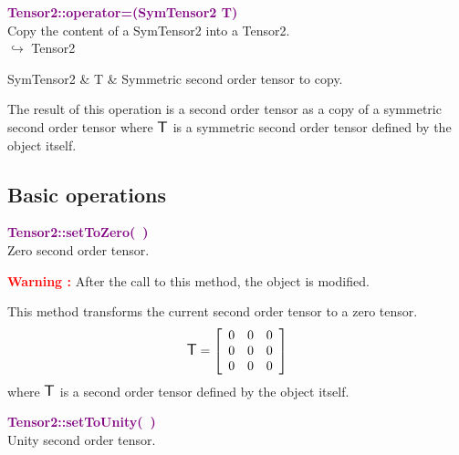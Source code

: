 \textcolor{purple}{\textbf{Tensor2::operator=(SymTensor2 T)}}\label{Tensor2::operator=(SymTensor2 T)}\\
Copy the content of a SymTensor2 into a Tensor2.\\ \hspace*{10mm}$\hookrightarrow$ Tensor2

\begin{tcolorbox}[width=\textwidth,myArgs,tabularx={ll|R}]
SymTensor2 & T & Symmetric second order tensor to copy.
\end{tcolorbox}

The result of this operation is a second order tensor as a copy of a symmetric second order tensor where $\mbox{\large\ensuremath{\mathsf{T}}}$ is a symmetric second order tensor defined by the object itself.

\subsection{Basic operations}

\textcolor{purple}{\textbf{Tensor2::setToZero(~)}}\label{Tensor2::setToZero()}\\
Zero second order tensor.

\hspace*{10mm}\textcolor{red}{\textbf{Warning :}} After the call to this method, the object is modified.

This method transforms the current second order tensor to a zero tensor.
\begin{equation*}
\mbox{\large\ensuremath{\mathsf{T}}}=\left[\begin{array}{ccc}
0 & 0 & 0\\
0 & 0 & 0\\
0 & 0 & 0
\end{array}\right]
\end{equation*}
where $\mbox{\large\ensuremath{\mathsf{T}}}$ is a second order tensor defined by the object itself.

\textcolor{purple}{\textbf{Tensor2::setToUnity(~)}}\label{Tensor2::setToUnity()}\\
Unity second order tensor.

